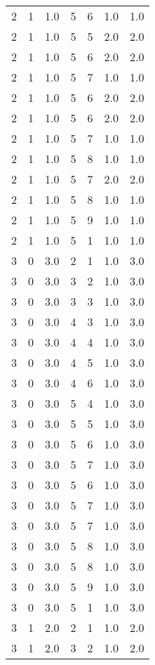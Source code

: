 \documentclass[a4paper,12pt]{article}
\begin{document}
\begin{center}
\begin{longtable}{ c c c | c c c | c }
        2 & 1 & 1.0 & 5 & 6 & 1.0 & 1.0 \\
        2 & 1 & 1.0 & 5 & 5 & 2.0 & 2.0 \\
        2 & 1 & 1.0 & 5 & 6 & 2.0 & 2.0 \\
        2 & 1 & 1.0 & 5 & 7 & 1.0 & 1.0 \\
        2 & 1 & 1.0 & 5 & 6 & 2.0 & 2.0 \\
        2 & 1 & 1.0 & 5 & 6 & 2.0 & 2.0 \\
        2 & 1 & 1.0 & 5 & 7 & 1.0 & 1.0 \\
        2 & 1 & 1.0 & 5 & 8 & 1.0 & 1.0 \\
        2 & 1 & 1.0 & 5 & 7 & 2.0 & 2.0 \\
        2 & 1 & 1.0 & 5 & 8 & 1.0 & 1.0 \\
        2 & 1 & 1.0 & 5 & 9 & 1.0 & 1.0 \\
        2 & 1 & 1.0 & 5 & 1 & 1.0 & 1.0 \\
        3 & 0 & 3.0 & 2 & 1 & 1.0 & 3.0 \\
        3 & 0 & 3.0 & 3 & 2 & 1.0 & 3.0 \\
        3 & 0 & 3.0 & 3 & 3 & 1.0 & 3.0 \\
        3 & 0 & 3.0 & 4 & 3 & 1.0 & 3.0 \\
        3 & 0 & 3.0 & 4 & 4 & 1.0 & 3.0 \\
        3 & 0 & 3.0 & 4 & 5 & 1.0 & 3.0 \\
        3 & 0 & 3.0 & 4 & 6 & 1.0 & 3.0 \\
        3 & 0 & 3.0 & 5 & 4 & 1.0 & 3.0 \\
        3 & 0 & 3.0 & 5 & 5 & 1.0 & 3.0 \\
        3 & 0 & 3.0 & 5 & 6 & 1.0 & 3.0 \\
        3 & 0 & 3.0 & 5 & 7 & 1.0 & 3.0 \\
        3 & 0 & 3.0 & 5 & 6 & 1.0 & 3.0 \\
        3 & 0 & 3.0 & 5 & 7 & 1.0 & 3.0 \\
        3 & 0 & 3.0 & 5 & 7 & 1.0 & 3.0 \\
        3 & 0 & 3.0 & 5 & 8 & 1.0 & 3.0 \\
        3 & 0 & 3.0 & 5 & 8 & 1.0 & 3.0 \\
        3 & 0 & 3.0 & 5 & 9 & 1.0 & 3.0 \\
        3 & 0 & 3.0 & 5 & 1 & 1.0 & 3.0 \\
        3 & 1 & 2.0 & 2 & 1 & 1.0 & 2.0 \\
        3 & 1 & 2.0 & 3 & 2 & 1.0 & 2.0 \\

\end{longtable}
\end{center}
\end{document}
